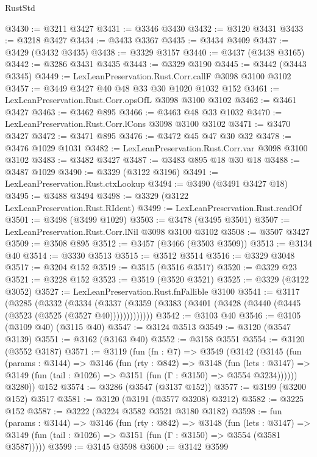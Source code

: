 \begin{lexlean}{RustStd}
\begin{coremodule}
{\begin{coremodule}
{{{{{{{{{{{{{{{{{{{{{{{{{{@3430 := @3211 @3427
@3431 := @3346 @3430
@3432 := @3120 @3431
@3433 := @3218 @3427
@3434 := @3433 @3367
@3435 := @3434 @3409
@3437 := @3429 (@3432 @3435)
@3438 := @3329 @3157
@3440 := @3437 (@3438 @3165)
@3442 := @3286 @3431 @3435
@3443 := @3329 @3190
@3445 := @3442 (@3443 @3345)
@3449 := LexLeanPreservation.Rust.Corr.callF @3098 @3100 @3102
@3457 := @3449 @3427 @40 @48 @33 @30 @1020 @1032 @152
@3461 := LexLeanPreservation.Rust.Corr.opsOfL @3098 @3100 @3102
@3462 := @3461 @3427
@3463 := @3462 @895
@3466 := @3463 @48 @33 @1032
@3470 := LexLeanPreservation.Rust.Corr.lCons @3098 @3100 @3102
@3471 := @3470 @3427
@3472 := @3471 @895
@3476 := @3472 @45 @47 @30 @32
@3478 := @3476 @1029 @1031
@3482 := LexLeanPreservation.Rust.Corr.var @3098 @3100 @3102
@3483 := @3482 @3427
@3487 := @3483 @895 @18 @30 @18
@3488 := @3487 @1029
@3490 := @3329 (@3122 @3196)
@3491 := LexLeanPreservation.Rust.ctxLookup
@3494 := @3490 (@3491 @3427 @18)
@3495 := @3488 @3494
@3498 := @3329 (@3122 LexLeanPreservation.Rust.RIdent)
@3499 := LexLeanPreservation.Rust.readOf
@3501 := @3498 (@3499 @1029)
@3503 := @3478 (@3495 @3501)
@3507 := LexLeanPreservation.Rust.Corr.lNil @3098 @3100 @3102
@3508 := @3507 @3427
@3509 := @3508 @895
@3512 := @3457 (@3466 (@3503 @3509))
@3513 := @3134 @40
@3514 := @3330 @3513
@3515 := @3512 @3514
@3516 := @3329 @3048
@3517 := @3204 @152
@3519 := @3515 (@3516 @3517)
@3520 := @3329 @23
@3521 := @3228 @152
@3523 := @3519 (@3520 @3521)
@3525 := @3329 (@3122 @3052)
@3527 := LexLeanPreservation.Rust.fnFallible @3100
@3541 := @3117
    (@3285
      (@3332
        (@3334
          (@3337 (@3359 (@3383 (@3401 (@3428 (@3440 (@3445 (@3523 (@3525 (@3527 @40)))))))))))))
@3542 := @3103 @40
@3546 := @3105 (@3109 @40) (@3115 @40)
@3547 := @3124 @3513
@3549 := @3120 (@3547 @3139)
@3551 := @3162 (@3163 @40)
@3552 := @3158 @3551
@3554 := @3120 (@3552 @3187)
@3571 := @3119
    (fun (fn : @7) =>
    @3549
      (@3142
        (@3145
          (fun (params : @3144) =>
          @3146
            (fun (rty : @842) =>
            @3148
              (fun (lets : @3147) =>
              @3149 (fun (tail : @1026) => @3151 (fun (Γ : @3150) => @3554 @3234))))))
        @3280))
    @152
@3574 := @3286 (@3547 (@3137 @152))
@3577 := @3199 (@3200 @152) @3517
@3581 := @3120 (@3191 (@3577 @3208) @3212)
@3582 := @3225 @152
@3587 := @3222 (@3224 @3582 @3521 @3180 @3182)
@3598 := fun (params : @3144) =>
  @3146
    (fun (rty : @842) =>
    @3148
      (fun (lets : @3147) =>
      @3149 (fun (tail : @1026) => @3151 (fun (Γ : @3150) => @3554 (@3581 @3587)))))
@3599 := @3145 @3598
@3600 := @3142 @3599
}}}}}}}}}}}}}}}}}}}}}}}}}}
\end{coremodule}}
\end{coremodule}
\end{lexlean}
